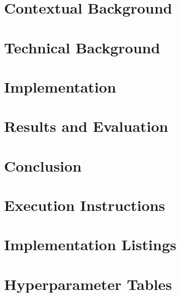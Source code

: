 \documentclass[ %
                author={Ainsley Rutterford},
                supervisor={Dr. Tilo Burghardt},
                degree={MEng},
                title={Coral Density Analysis using Deep Learning},
                subtitle={},
                type={research},
                year={2020} ]{dissertation}
\begin{document}
\mainmatter

\chapter{Contextual Background}
\label{chap:context}


\chapter{Technical Background}
\label{chap:technical}


\chapter{Implementation}
\label{chap:implementation}


\chapter{Results and Evaluation}
\label{chap:evaluation}


\chapter{Conclusion}
\label{chap:conclusion}


\backmatter



\appendix

\chapter{Execution Instructions}
\label{appx:instructions}


\chapter{Implementation Listings}
\label{appx:implementationlistings}


\chapter{Hyperparameter Tables}
\label{appx:hyperparamtables}

\end{document}

